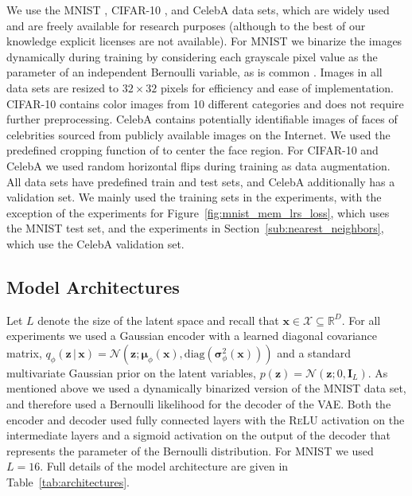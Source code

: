\documentclass{article}
\newcommand{\bft}[1]{\mathbf{#1}}
\newcommand{\bfs}[1]{\boldsymbol{#1}}
\newcommand{\given}{\,|\,}
\begin{document}
We use the MNIST \cite{lecun1998mnist}, CIFAR-10 
\cite{krizhevsky2009learning}, and CelebA \cite{liu2015faceattributes} data 
sets, which are widely used and are freely available for research purposes 
(although to the best of our knowledge explicit licenses are not available). 
For MNIST we binarize the images dynamically during training by considering 
each grayscale pixel value as the parameter of an independent Bernoulli 
variable, as is common \cite{salakhutdinov2008quantitative,vahdat2020nvae}.  
Images in all data sets are resized to $32\times 32$ pixels for efficiency and 
ease of implementation. CIFAR-10 contains color images from 10 different 
categories and does not require further preprocessing. CelebA contains 
potentially identifiable images of faces of celebrities sourced from publicly 
available images on the Internet. We used the predefined cropping function of 
\cite{vahdat2020nvae} to center the face region. For CIFAR-10 and CelebA we 
used random horizontal flips during training as data augmentation. All data 
sets have predefined train and test sets, and CelebA additionally has a 
validation set. We mainly used the training sets in the experiments, with the 
exception of the experiments for Figure~\ref{fig:mnist_mem_lrs_loss}, which 
uses the MNIST test set, and the experiments in 
Section~\ref{sub:nearest_neighbors}, which use the CelebA validation set.

\subsection{Model Architectures}%
\label{sub:model_architectures}

Let $L$ denote the size of the latent space and recall that $\bft{x} \in 
\mathcal{X} \subseteq \mathbb{R}^D$. For all experiments we used a Gaussian 
encoder with a learned diagonal covariance matrix, $q_{\phi}(\bft{z} \given 
\bft{x}) = \mathcal{N}(\bft{z} ; \bfs{\mu}_{\phi}(\bft{x}), 
\text{diag}(\bfs{\sigma}_{\phi}^2(\bft{x})))$  and a standard multivariate 
Gaussian prior on the latent variables, $p(\bft{z}) = \mathcal{N}(\bft{z} ; 0, 
\bft{I}_L)$. As mentioned above we used a dynamically binarized version of the 
MNIST data set, and therefore used a Bernoulli likelihood for the decoder of 
the VAE. Both the encoder and decoder used fully connected layers with the 
\textsc{ReLU} activation on the intermediate layers \cite{nair2010rectified} 
and a sigmoid activation on the output of the decoder that represents the 
parameter of the Bernoulli distribution. For MNIST we used $L = 16$. Full 
details of the model architecture are given in Table~\ref{tab:architectures}.
\end{document}

